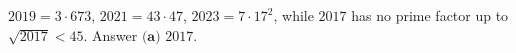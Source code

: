 $2019=3\cdot673$, $2021=43\cdot47$, $2023=7\cdot17^2$, while $2017$ has no prime factor up to $\sqrt{2017}<45$. Answer $\boxed{\textbf{(a) }2017}$.
